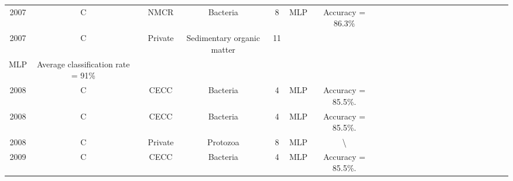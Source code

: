\begin{landscape}
\begin{longtable}{cccccccccccccccccccccccc}
2007 & C    & \cite{Xiaojuan-2007-ANBR}     & NMCR             & Bacteria                                       & 8                & MLP                                                            & Accuracy = 86.3\%                                                                                                                                                                 \\
2007 & C    & \cite{Weller-2007-TSNN}       & Private          & Sedimentary organic matter                     & 11               & \begin{tabular}[c]{@{}c@{}}RBF\\ MLP\end{tabular}              & Average classification rate = 91\%                                                                                                                                                \\
2008 & C    & \cite{Xiaojuan-2008-ANWB}     & CECC             & Bacteria                                       & 4                & MLP                                                            & Accuracy = 85.5\%.                                                                                                                                                                \\
2008 & C    & \cite{Cunshe-2008-ANWB}       & CECC             & Bacteria                                       & 4                & MLP                                                            & Accuracy = 85.5\%.                                                                                                                                                                \\
2008 & C    & \cite{Amaral-2008-SPII}       & Private          & Protozoa                                       & 8                & MLP                                                            & \textbackslash{}                                                                                                                                                                  \\
2009 & C    & \cite{Xiaojuan-2009-AIBN}     & CECC             & Bacteria                                       & 4                & MLP                                                            & Accuracy = 85.5\%.                                                                                                                                                                \\




\end{longtable}
\end{landscape}
